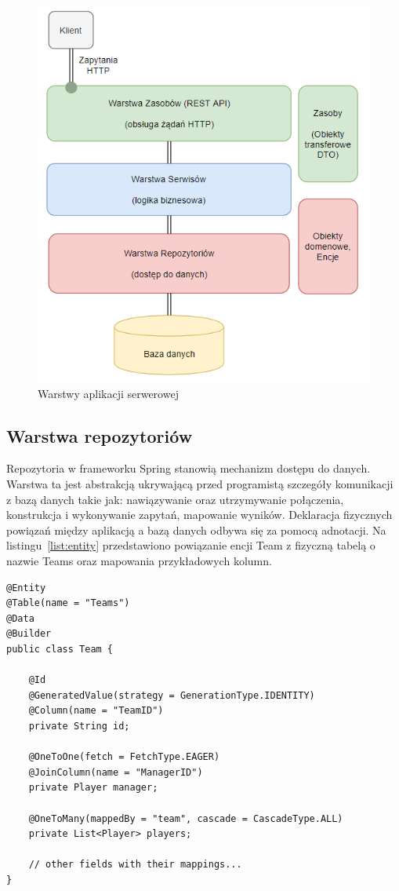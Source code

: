 \begin{figure}[H]
\centering
\includegraphics[width=0.5\linewidth]{06-implementacja/rys/layers.PNG}
\caption{Warstwy aplikacji serwerowej}
\label{fig:app-layers}
\end{figure}


\subsection{Warstwa repozytoriów}

Repozytoria w frameworku Spring stanowią mechanizm dostępu do danych. Warstwa ta jest abstrakcją ukrywającą przed programistą szczegóły komunikacji z bazą danych takie jak: nawiązywanie oraz utrzymywanie połączenia, konstrukcja i wykonywanie zapytań, mapowanie wyników. Deklaracja fizycznych powiązań między aplikacją a bazą danych odbywa się za pomocą adnotacji. Na listingu~\ref{list:entity} przedstawiono powiązanie encji Team z fizyczną tabelą o nazwie Teams oraz mapowania przykładowych kolumn.

\begin{lstlisting}[label=list:entity, caption=Fragment przykładowej encji, basicstyle=\footnotesize\ttfamily]
@Entity
@Table(name = "Teams")
@Data
@Builder
public class Team {

    @Id
    @GeneratedValue(strategy = GenerationType.IDENTITY)
    @Column(name = "TeamID")
    private String id;

    @OneToOne(fetch = FetchType.EAGER)
    @JoinColumn(name = "ManagerID")
    private Player manager;

    @OneToMany(mappedBy = "team", cascade = CascadeType.ALL)
    private List<Player> players;
    
    // other fields with their mappings...
}
\end{lstlisting}

